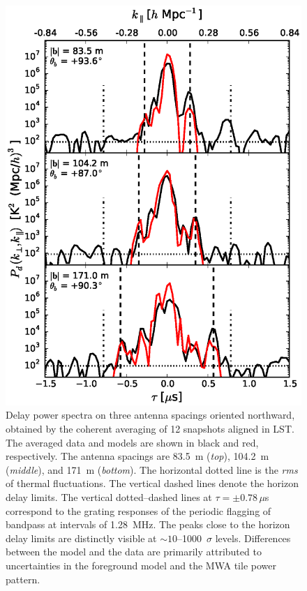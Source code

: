 \documentclass[preprint2,apjl,numberedappendix,twocolappendix,appendixfloats]{emulateapj}
\begin{document}
\begin{figure}[htb]
\centering
\includegraphics[width=\linewidth]{f2.eps}
\caption{Delay power spectra on three antenna spacings oriented northward, obtained by the coherent averaging of 12 snapshots aligned in LST. The averaged data and models are shown in black and red, respectively. The antenna spacings are 83.5~m ({\it top}), 104.2~m ({\it middle}), and 171~m ({\it bottom}). The horizontal dotted line is the {\it rms} of thermal fluctuations. The vertical dashed lines denote the horizon delay limits. The vertical dotted--dashed lines at $\tau = \pm 0.78\,\mu$s correspond to the grating responses of the periodic flagging of bandpass at intervals of 1.28~MHz. The peaks close to the horizon delay limits are distinctly visible at $\sim 10$--1000~$\sigma$ levels. Differences between the model and the data are primarily attributed to uncertainties in the foreground model and the MWA tile power pattern. \label{fig:3-baseline-comparison-delay-spectra}}
\end{figure}
\end{document}
